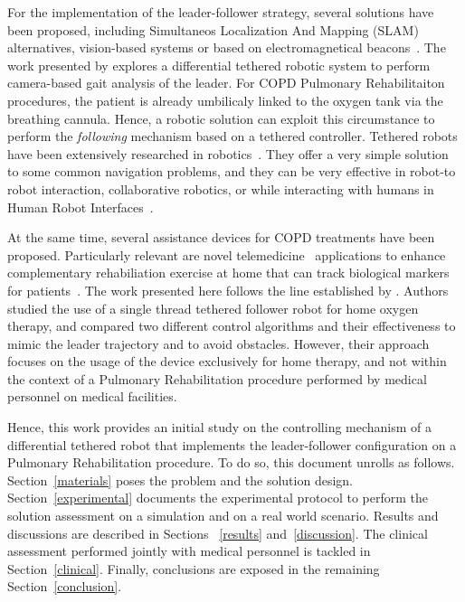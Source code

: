 \documentclass[journal]{IEEEtran}
\begin{document}
For the implementation of the leader-follower strategy, several solutions have been proposed, including Simultaneos Localization And Mapping (SLAM) alternatives, vision-based systems or based on electromagnetical beacons~\cite{Islam2019}.   The work presented by \cite{Ortlieb2016} explores a differential tethered robotic system to perform camera-based gait analysis of the leader.  For COPD Pulmonary Rehabilitaiton procedures, the patient is already umbilicaly linked to the oxygen tank via the breathing cannula.  Hence, a robotic solution can exploit this circumstance to perform the \textit{following} mechanism based on a tethered controller. Tethered robots have been extensively researched in robotics~\cite{Ahn2006}.  They offer a very simple solution to some common navigation problems, and they can be very effective in robot-to robot interaction, collaborative robotics, or while interacting with humans in Human Robot Interfaces~\cite{Rekleitis2001,Hirata2009,Ferrin2010}. 

At the same time, several assistance devices for COPD treatments have been proposed.  Particularly relevant are novel telemedicine~\cite{Banerjee2020} applications to enhance complementary rehabiliation exercise at home that can track biological markers for patients~\cite{Yang2018,Wu2012}.  The work presented here follows the line established by \cite{Endo2015}.  Authors studied the use of a single thread tethered follower robot for home oxygen therapy, and compared two different control algorithms and their effectiveness to mimic the leader trajectory and to avoid obstacles.  However, their approach focuses on the usage of the device exclusively for home therapy, and not within the context of a Pulmonary Rehabilitation procedure performed by medical personnel on medical facilities.

Hence, this work provides an initial study on the controlling mechanism of a differential tethered robot that implements the leader-follower configuration on a Pulmonary Rehabilitation procedure.  To do so, this document unrolls as follows.  Section~\ref{materials} poses the problem and the solution design. Section~\ref{experimental} documents the experimental protocol to perform the solution assessment on a simulation and on a real world scenario.  Results and discussions are described in Sections ~\ref{results} and~\ref{discussion}. The clinical assessment performed jointly with medical personnel is tackled in Section~\ref{clinical}.  Finally, conclusions are exposed in the remaining Section~\ref{conclusion}.
\end{document}
